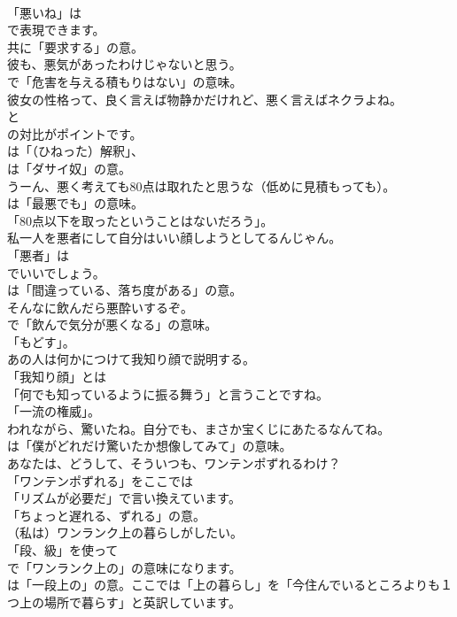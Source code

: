 \documentclass[8pt]{extreport}
\begin{document}
\begin{CJK}{UTF8}{min}
\\	「悪いね」は
\\	で表現できます。
\\	共に「要求する」の意。	
\\	彼も、悪気があったわけじゃないと思う。 
\\	で「危害を与える積もりはない」の意味。	
\\	彼女の性格って、良く言えば物静かだけれど、悪く言えばネクラよね。 
\\	と 
\\	の対比がポイントです。
\\	は「（ひねった）解釈」、
\\	は「ダサイ奴」の意。	
\\	うーん、悪く考えても80点は取れたと思うな（低めに見積もっても）。 
\\	は「最悪でも」の意味。
\\	「80点以下を取ったということはないだろう」。	
\\	私一人を悪者にして自分はいい顔しようとしてるんじゃん。 
\\	「悪者」は 
\\	でいいでしょう。
\\	は「間違っている、落ち度がある」の意。	
\\	そんなに飲んだら悪酔いするぞ。 
\\	で「飲んで気分が悪くなる」の意味。
\\	「もどす」。	
\\	あの人は何かにつけて我知り顔で説明する。 
\\	「我知り顔」とは
\\	「何でも知っているように振る舞う」と言うことですね。
\\	「一流の権威」。	
\\	われながら、驚いたね。自分でも、まさか宝くじにあたるなんてね。 
\\	は「僕がどれだけ驚いたか想像してみて」の意味。	
\\	あなたは、どうして、そういつも、ワンテンポずれるわけ？ 
\\	「ワンテンポずれる」をここでは
\\	「リズムが必要だ」で言い換えています。
\\	「ちょっと遅れる、ずれる」の意。	
\\	（私は）ワンランク上の暮らしがしたい。 
\\	「段、級」を使って
\\	で「ワンランク上の」の意味になります。
\\	は「一段上の」の意。ここでは「上の暮らし」を「今住んでいるところよりも１つ上の場所で暮らす」と英訳しています。	
\end{CJK}
\end{document}

